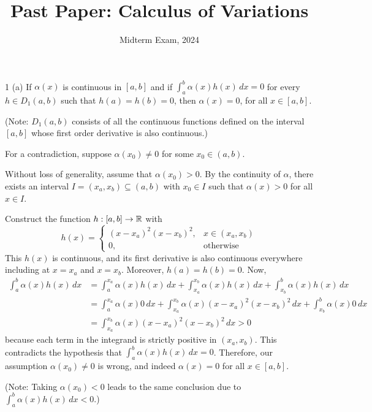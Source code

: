 \documentclass[11pt]{penrose}
\title{Past Paper: Calculus of Variations}
\subtitle{Midterm Exam, 2024}
\begin{document}
\maketitle
\warningtext

\begin{problem}{1 (a)}
    If $\alpha(x)$ is continuous in $[a,b]$ and if $\int_a^b \alpha(x) h(x) \,dx = 0$ for every $h \in D_{1}(a,b)$ such that $h(a) = h(b) = 0$, then $\alpha(x) = 0$, for all $x \in [a,b]$.

    (Note: $D_{1}(a,b)$ consists of all the continuous functions defined on the interval $[a,b]$ whose first order derivative is also continuous.)

    \solution For a contradiction, suppose $\alpha(x_0) \neq 0$ for some $x_0 \in (a,b)$.

    Without loss of generality, assume that $\alpha(x_0) > 0$. By the continuity of $\alpha$, there exists an interval $I = (x_a, x_b) \subseteq (a,b)$ with $x_0 \in I$ such that $\alpha(x) > 0$ for all $x \in I$.

    Construct the function $h:[a,b] \to \mathbb{R}$ with
    \begin{equation*}
        h(x) =
        \begin{cases}
            (x - x_a)^2 (x - x_b)^2, & x \in (x_a, x_b) \\
            0, & \text{otherwise}
        \end{cases}
    \end{equation*}
    This $h(x)$ is continuous, and its first derivative is also continuous everywhere including at $x = x_a$ and $x = x_b$. Moreover, $h(a) = h(b) = 0$. Now,
    \begin{align*}
        \int_a^b \alpha(x) h(x) \,dx
        &= \int_a^{x_a} \alpha(x) h(x) \,dx
        + \int_{x_a}^{x_b} \alpha(x) h(x) \,dx
        + \int_{x_b}^b \alpha(x) h(x) \,dx\\
        &= \int_a^{x_a} \alpha(x) 0 \,dx
        + \int_{x_a}^{x_b} \alpha(x) (x - x_a)^2 (x - x_b)^2 \,dx
        + \int_{x_b}^b \alpha(x) 0 \,dx\\
        &= \int_{x_a}^{x_b} \alpha(x) (x - x_a)^2 (x - x_b)^2 \,dx
        > 0
    \end{align*}
    because each term in the integrand is strictly positive in $(x_a, x_b)$. This contradicts the hypothesis that $\int_a^b \alpha(x) h(x) \,dx = 0$. Therefore, our assumption $\alpha(x_0) \neq 0$ is wrong, and indeed $\alpha(x) = 0$ for all $x \in [a,b]$.

    (Note: Taking $\alpha(x_0) < 0$ leads to the same conclusion due to $\int_a^b \alpha(x) h(x) \,dx < 0$.)
\end{problem}
\end{document}
